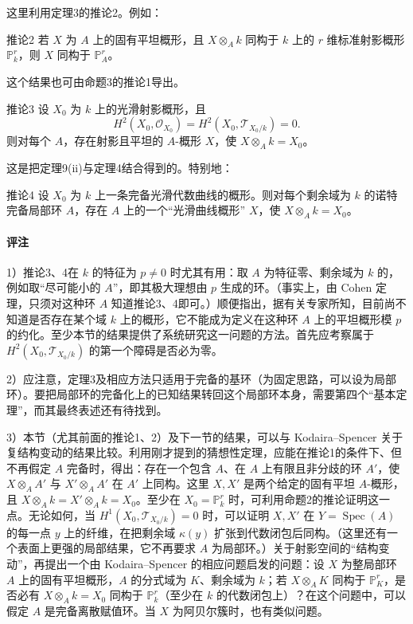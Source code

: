 这里利用定理3的推论2。例如：
\begin{statement}{推论2}
若 $X$ 为 $A$ 上的固有平坦概形，且 $X\otimes_Ak$ 同构于 $k$ 上的 $r$ 维标准射影概形 $\mathbb P_k^r$，则 $X$ 同构于 $\mathbb P_A^r$。
\end{statement}
这个结果也可由命题3的推论1导出。
\begin{statement}{推论3}
设 $X_0$ 为 $k$ 上的光滑射影概形，且
\[
H^2(X_0,\mathcal O_{X_0})=H^2(X_0,\mathcal T_{X_0/k})=0.
\]
则对每个 $A$，存在射影且平坦的 $A$-概形 $X$，使 $X\otimes_Ak=X_0$。
\end{statement}
这是把定理9(ii)与定理4结合得到的。特别地：
\begin{statement}{推论4}
设 $X_0$ 为 $k$ 上一条完备光滑代数曲线的概形。则对每个剩余域为 $k$ 的诺特完备局部环 $A$，存在 $A$ 上的一个“光滑曲线概形” $X$，使 $X\otimes_Ak=X_0$。
\end{statement}
\paragraph{评注}
1）推论3、4在 $k$ 的特征为 $p\ne0$ 时尤其有用：取 $A$ 为特征零、剩余域为 $k$ 的，例如取“尽可能小的 $A$”，即其极大理想由 $p$ 生成的环。（事实上，由 Cohen 定理，只须对这种环 $A$ 知道推论3、4即可。）顺便指出，据有关专家所知，目前尚不知道是否存在某个域 $k$ 上的概形，它不能成为定义在这种环 $A$ 上的平坦概形模 $p$ 的约化。至少本节的结果提供了系统研究这一问题的方法。首先应考察属于 $H^2(X_0,\mathcal T_{X_0/k})$ 的第一个障碍是否必为零。

2）应注意，定理3及相应方法只适用于完备的基环（为固定思路，可以设为局部环）。要把局部环的完备化上的已知结果转回这个局部环本身，需要第四个“基本定理”，而其最终表述还有待找到。

3）本节（尤其前面的推论1、2）及下一节的结果，可以与 Kodaira--Spencer 关于复结构变动的结果比较。利用刚才提到的猜想性定理，应能在推论1的条件下、但不再假定 $A$ 完备时，得出：存在一个包含 $A$、在 $A$ 上有限且非分歧的环 $A'$，使 $X\otimes_A A'$ 与 $X'\otimes_A A'$ 在 $A'$ 上同构。这里 $X,X'$ 是两个给定的固有平坦 $A$-概形，且 $X\otimes_Ak=X'\otimes_Ak=X_0$。至少在 $X_0=\mathbb P_k^r$ 时，可利用命题2的推论证明这一点。无论如何，当 $H^1(X_0,\mathcal T_{X_0/k})=0$ 时，可以证明 $X,X'$ 在 $Y=\operatorname{Spec}(A)$ 的每一点 $y$ 上的纤维，在把剩余域 $\kappa(y)$ 扩张到代数闭包后同构。（这里还有一个表面上更强的局部结果，它不再要求 $A$ 为局部环。）关于射影空间的“结构变动”，再提出一个由 Kodaira--Spencer 的相应问题启发的问题：设 $X$ 为整局部环 $A$ 上的固有平坦概形，$A$ 的分式域为 $K$、剩余域为 $k$；若 $X\otimes_AK$ 同构于 $\mathbb P_K^r$，是否必有 $X\otimes_Ak=X_0$ 同构于 $\mathbb P_k^r$（至少在 $k$ 的代数闭包上）？在这个问题中，可以假定 $A$ 是完备离散赋值环。当 $X$ 为阿贝尔簇时，也有类似问题。

